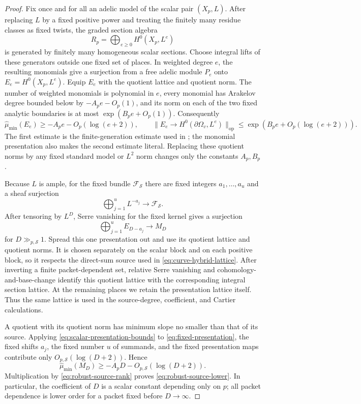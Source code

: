 \documentclass[11pt]{article}
\theoremstyle{definition}
\theoremstyle{remark}
\newcommand{\calF}{\mathcal F}
\begin{document}
\begin{proof}
Fix once and for all an adelic model of the scalar pair $(X_p,L)$.  After
replacing $L$ by a fixed positive power and treating the finitely many residue
classes as fixed twists, the graded section algebra
\[
 R_p=\bigoplus_{e\ge0}H^0(X_p,L^e)
\]
is generated by finitely many homogeneous scalar sections.  Choose integral
lifts of these generators outside one fixed set of places.  In weighted degree
$e$, the resulting monomials give a surjection from a free adelic module
$P_e$ onto $E_e=H^0(X_p,L^e)$.  Equip $E_e$ with the quotient lattice and
quotient norm.  The number of weighted monomials is polynomial in $e$, every
monomial has Arakelov degree bounded below by $-A_pe-O_p(1)$, and its norm on
each of the two fixed analytic boundaries is at most
$\exp(B_pe+O_p(1))$.  Consequently
\begin{equation}\label{eq:scalar-presentation-bounds}
 \widehat\mu_{\min}(E_e)\ge-A_pe-O_p(\log(e+2)),
 \qquad
 \|E_e\longrightarrow H^0(\partial\Omega_v,L^e)\|_{\mathrm{op}}
 \le\exp(B_pe+O_p(\log(e+2))).
\end{equation}
The first estimate is the finite-generation estimate used in
\cite[Theorem~6.1, (6.8)]{BostChambertLoir2009}; the monomial presentation
also makes the second estimate literal.  Replacing these quotient norms by any
fixed standard model or $L^2$ norm changes only the constants $A_p,B_p$.

Because $L$ is ample, for the fixed bundle $\calF_{\mathcal S}$ there are
fixed integers $a_1,\ldots,a_u$ and a sheaf surjection
\[
 \bigoplus_{j=1}^uL^{-a_j}\longrightarrow\calF_{\mathcal S}.
\]
After tensoring by $L^D$, Serre vanishing for the fixed kernel gives a
surjection
\begin{equation}\label{eq:fixed-presentation}
 \bigoplus_{j=1}^uE_{D-a_j}\longrightarrow M_D
\end{equation}
for $D\gg_{p,\mathcal S}1$.  Spread this one presentation out and use its
quotient lattice and quotient norms.  It is chosen separately on the scalar
block and on each positive block, so it respects the direct-sum source used in
\cref{eq:curve-hybrid-lattice}.  After inverting a finite packet-dependent set,
relative Serre vanishing and cohomology-and-base-change identify this quotient
lattice with the corresponding integral section lattice.  At the remaining
places we retain the presentation lattice itself.  Thus the same lattice is
used in the source-degree, coefficient, and Cartier calculations.

A quotient with its quotient norm has minimum slope no smaller than that of
its source.  Applying \eqref{eq:scalar-presentation-bounds} to
\eqref{eq:fixed-presentation}, the fixed shifts $a_j$, the fixed number $u$ of
summands, and the fixed presentation maps contribute only
$O_{p,\mathcal S}(\log(D+2))$.  Hence
\[
 \widehat\mu_{\min}(M_D)
 \ge-A_pD-O_{p,\mathcal S}(\log(D+2)).
\]
Multiplication by \eqref{eq:robust-source-rank} proves
\eqref{eq:robust-source-lower}.  In particular, the coefficient of $D$ is a
scalar constant depending only on $p$; all packet dependence is lower order
for a packet fixed before $D\to\infty$.


\end{proof}
\end{document}
